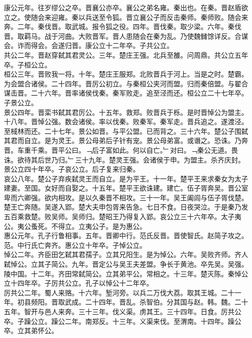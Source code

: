 \documentclass{zhvt-classic}
\begin{document}
\hspace*{2em}康公元年。往岁缪公之卒。晋襄公亦卒。襄公之弟名雍。秦出也。在秦。晋赵盾欲立之。使随会来迎雍。秦以兵送至令狐。晋立襄公子而反击秦师。秦师败。随会来奔。二年。秦伐晋。取武城。报令狐之役。四年。晋伐秦。取少梁。六年。秦伐晋。取羁马。战于河曲。大败晋军。晋人患随会在秦为乱。乃使魏雠馀详反。合谋会。诈而得会。会遂归晋。康公立十二年卒。子共公立。\\
\hspace*{2em}共公二年。晋赵穿弑其君灵公。三年。楚庄王强。北兵至雒。问周鼎。共公立五年卒。子桓公立。\\
\hspace*{2em}桓公三年。晋败我一将。十年。楚庄王服郑。北败晋兵于河上。当是之时。楚霸。为会盟合诸侯。二十四年。晋厉公初立。与秦桓公夹河而盟。归而秦倍盟。与翟合谋击晋。二十六年。晋率诸侯伐秦。秦军败走。追至泾而还。桓公立二十七年卒。子景公立。\\
\hspace*{2em}景公四年。晋栾书弑其君厉公。十五年。救郑。败晋兵于栎。是时晋悼公为盟主。十八年。晋悼公强。数会诸侯。率以伐秦。败秦军。秦军走。晋兵追之。遂渡泾。至棫林而还。二十七年。景公如晋。与平公盟。已而背之。三十六年。楚公子围弑其君而自立。是为灵王。景公母弟后子针有宠。景公母弟富。或谮之。恐诛。乃奔晋。车重千乘。晋平公曰。﹁后子富如此。何以自亡。﹂对曰。﹁秦公无道。畏诛。欲待其后世乃归。﹂三十九年。楚灵王强。会诸侯于申。为盟主。杀齐庆封。景公立四十年卒。子哀公立。后子复来归秦。\\
\hspace*{2em}哀公八年。楚公子弃疾弑灵王而自立。是为平王。十一年。楚平王来求秦女为太子建妻。至国。女好而自娶之。十五年。楚平王欲诛建。建亡。伍子胥奔吴。晋公室卑而六卿强。欲内相攻。是以久秦晋不相攻。三十一年。吴王阖闾与伍子胥伐楚。楚王亡奔随。吴遂入郢。楚大夫申包胥来告急。七日不食。日夜哭泣。于是秦乃发五百乘救楚。败吴师。吴师归。楚昭王乃得复入郢。哀公立三十六年卒。太子夷公。夷公蚤死。不得立。立夷公子。是为惠公。\\
\hspace*{2em}惠公元年。孔子行鲁相事。五年。晋卿中行。范氏反晋。晋使智氏。赵简子攻之。范。中行氏亡奔齐。惠公立十年卒。子悼公立。\\
\hspace*{2em}悼公二年。齐臣田乞弑其君孺子。立其兄阳生。是为悼公。六年。吴败齐师。齐人弑悼公。立其子简公。九年。晋定公与吴王夫差盟。争长于黄池。卒先吴。吴强。陵中国。十二年。齐田常弑简公。立其弟平公。常相之。十三年。楚灭陈。秦悼公立十四年卒。子厉共公立。孔子以悼公十二年卒。\\
\hspace*{2em}厉共公二年。蜀人来赂。十六年。堑河旁。以兵二万伐大荔。取其王城。二十一年。初县频阳。晋取武成。二十四年。晋乱。杀智伯。分其国与赵。韩。魏。二十五年。智开与邑人来奔。三十三年。伐义渠。虏其王。三十四年。日食。厉共公卒。子躁公立。躁公二年。南郑反。十三年。义渠来伐。至渭南。十四年。躁公卒。立其弟怀公。\\
\end{document}
